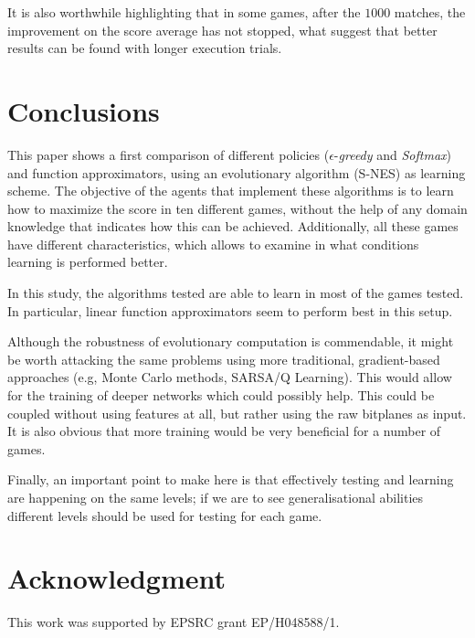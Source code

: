 \documentclass[conference]{IEEEtran}
\begin{document}
It is also worthwhile highlighting that in some games, after the $1000$ matches, the improvement on the score average has not stopped, what suggest that better results can be found with longer execution trials.


\section{Conclusions} \label{sec:conc}

This paper shows a first comparison of different policies ($\epsilon$-\textit{greedy} and \textit{Softmax}) and function approximators, using an evolutionary algorithm (S-NES) as learning scheme. The objective of the agents that implement these algorithms is to learn how to maximize the score in ten different games, without the help of any domain knowledge that indicates how this can be achieved. Additionally, all these games have different characteristics, which allows to examine in what conditions learning is performed better.

In this study, the algorithms tested are able to learn in most of the games tested. In particular, linear function approximators seem to perform best in this setup. 

Although the robustness of evolutionary computation is commendable, it might be worth attacking the same problems using more traditional, gradient-based approaches (e.g, Monte Carlo methods, SARSA/Q Learning). This would allow for the training of deeper networks which could possibly help. This could be coupled without using features at all, but rather using the raw bitplanes as input. It is also obvious that more training would be very beneficial for a number of games. 

Finally, an important point to make here is that effectively testing and learning are happening on the same levels; if we are to see generalisational abilities different levels should be used for testing for each game. 

 
\section*{Acknowledgment}


\noindent This work was supported by EPSRC grant EP/H048588/1.

 



\end{document}
